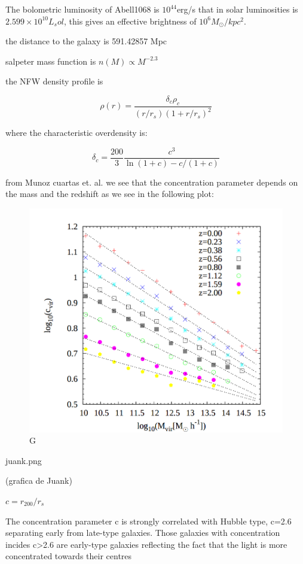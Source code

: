 The bolometric luminosity of Abell1068 is $10^44$erg/s that in solar luminosities is $2.599\times 10^{10} L_sol$, this gives an effective brightness of $10^{6}M_{\odot}/kpc^2$.

the distance to the galaxy is 591.42857 Mpc	

salpeter mass function is $n(M)\propto M^{-2.3}$  

the NFW density profile is 

\begin{equation}
\rho(r)=\frac{\delta_{c}\rho_{c}}{(r/r_{s})(1+r/r_{s})^{2}}
\end{equation}

where the characteristic overdensity is:

\begin{equation}
\delta_{c}=\frac{200}{3}\frac{c^{3}}{\ln{(1+c)}-c/(1+c)}
\end{equation}

from Munoz cuartas et. al. we see that the concentration parameter depends on the mass and the redshift as we see in the following plot:

\begin{figure}[H]
\centering
\includegraphics[width=12cm]{images/juank.png}
\caption[M]{G}
\end{figure}
juank.png

(grafica de Juank)

$c=r_{200}/r_{s}$

The concentration parameter c is strongly correlated with Hubble type, c=2.6 separating early from late-type galaxies. Those galaxies with concentration incides c>2.6 are early-type galaxies reflecting the fact that the light is more concentrated towards their centres

